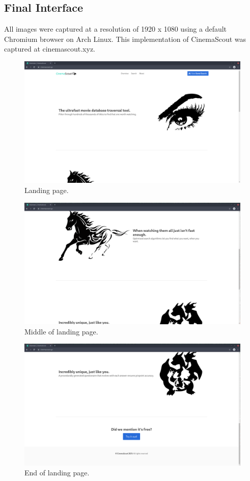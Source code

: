 \documentclass{article}
\begin{document}
\subsection{Final Interface}
All images were captured at a resolution of 1920 x 1080 using a default
Chromium browser on Arch Linux. This implementation of CinemaScout was captured
at cinemascout.xyz.
\begin{figure}[H]
\includegraphics[width=\columnwidth]{res/main_0.png}
\caption{Landing page.}
\end{figure}
\begin{figure}[H]
\includegraphics[width=\columnwidth]{res/main_1.png}
\caption{Middle of landing page.}
\end{figure}
\begin{figure}[H]
\includegraphics[width=\columnwidth]{res/main_2.png}
\caption{End of landing page.}
\end{figure}
\end{document}
